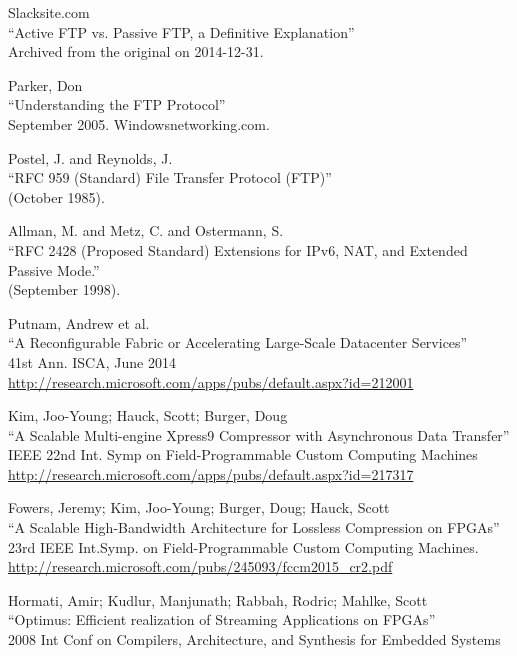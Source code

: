 \begin{thebibliography}{99}
 Slacksite.com\\
``Active FTP vs. Passive FTP, a Definitive Explanation''\\
Archived from the original on 2014-12-31.

 Parker, Don\\
``Understanding the FTP Protocol''\\
September 2005. Windowsnetworking.com.

 Postel, J. and Reynolds, J.\\
``RFC 959 (Standard) File Transfer Protocol (FTP)''\\
(October 1985).

 Allman, M. and Metz, C. and Ostermann, S.\\
``RFC 2428 (Proposed Standard) Extensions for IPv6, NAT, and 
Extended Passive Mode.''\\
(September 1998).

 Putnam, Andrew et al.\\
``A Reconfigurable Fabric or Accelerating Large-Scale Datacenter Services''\\
41st Ann. ISCA, June 2014\\
\url{http://research.microsoft.com/apps/pubs/default.aspx?id=212001}

 Kim, Joo-Young; Hauck, Scott; Burger, Doug\\
``A Scalable Multi-engine Xpress9 Compressor with Asynchronous Data Transfer''\\
IEEE 22nd Int. Symp on Field-Programmable Custom Computing Machines\\
\url{http://research.microsoft.com/apps/pubs/default.aspx?id=217317}

 Fowers, Jeremy; Kim, Joo-Young; Burger, Doug; Hauck, Scott\\
``A Scalable High-Bandwidth Architecture for Lossless Compression on FPGAs''\\
23rd IEEE Int.Symp. on Field-Programmable Custom Computing Machines.
\url{http://research.microsoft.com/pubs/245093/fccm2015\_cr2.pdf}

 Hormati, Amir; Kudlur, Manjunath; Rabbah, Rodric; Mahlke, Scott\\
``Optimus: Efficient realization of Streaming Applications on FPGAs''\\
2008 Int Conf on Compilers, Architecture, and Synthesis for Embedded Systems


\end{thebibliography}
